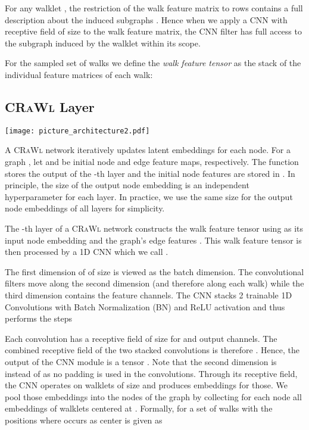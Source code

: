 \documentclass{scrartcl} \usepackage[dvipsnames]{xcolor}
\newcommand{\crawl}{\textsc{CRaWl}}
\begin{document}
    For any walklet , the restriction of the walk feature matrix to rows  contains a full description about the induced subgraphs . 
    Hence when we apply a CNN with receptive field of size  to the walk feature matrix, the CNN filter has full access to the subgraph induced by the walklet within its scope.


    For the sampled set of walks  we define the \emph{walk feature tensor}  as the stack of the individual feature matrices of each walk:
    
    

\subsection{\crawl{} Layer}
    \label{CNN}
    \begin{figure*}[t]
        \centering
        \texttt{[image: picture\_architecture2.pdf]}
        \caption{Top: Update procedure of latent node embeddings  in a \crawl{} layer.  is a set of random walks. Bottom: Architecture of a 3-layer \crawl{} network as used in the experiments.}
        \label{fig:architecture}
    \end{figure*} 
    A \crawl{} network iteratively updates latent embeddings for each node.
    For a graph , let  and  be initial node and edge feature maps, respectively.
    The function  stores the output of the -th layer and the initial node features are stored in .
    In principle, the size of the output node embedding  is an independent hyperparameter for each layer.
    In practice, we use the same size  for the output node embeddings of all layers for simplicity.
    
    
    The -th layer of a \crawl{} network constructs the walk feature tensor  using  as its input node embedding and the graph's edge features .
This walk feature tensor is then processed by a 1D CNN which we call .
    
    The first dimension of  of size  is viewed as the batch dimension.
    The convolutional filters move along the second dimension (and therefore along each walk) while the third dimension contains the feature channels.
The CNN stacks 2 trainable 1D Convolutions with Batch Normalization (BN) and ReLU activation and thus performs the steps
    
    Each convolution has a receptive field of size  for  and  output channels.
    The combined receptive field of the two stacked convolutions is therefore .
    Hence, the output of the CNN module is a tensor .
    Note that the second dimension is  instead of  as no padding is used in the convolutions.
    Through its receptive field, the CNN operates on walklets of size  and produces embeddings for those.
    We pool those embeddings into the nodes of the graph by collecting for each node  all embeddings of walklets centered at .
    Formally, for a set of walks  with  the positions where  occurs as center is given as
\end{document}
